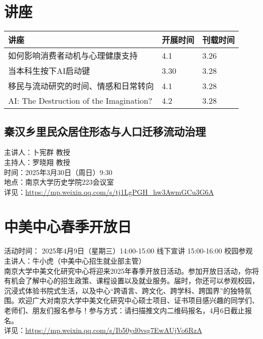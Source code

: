 \documentclass[letterpaper, 12pt]{article}
\begin{document}
\begin{multicols}{2}
\pagebreak

\section{讲座}
\begin{tabular}{|>{\centering\arraybackslash}m{}|m{}|m{}|}
    \hline
    讲座 & 开展时间 & 刊载时间\\
    \hline\hline
    如何影响消费者动机与心理健康支持 & 4.1 & 3.26\\\hline
    当本科生按下AI启动键 & 3.30 & 3.28\\\hline
    移民与流动研究的时间、情感和日常转向 & 4.1 & 3.28\\\hline
    AI: The Destruction of the Imagination? & 4.2 & 3.28\\\hline
\end{tabular}
\subsection{ 秦汉乡里民众居住形态与人口迁移流动治理}
主讲人：卜宪群 教授
\\主持人：罗晓翔 教授
\\时间：2025年3月30日（周日）9:30
\\地点：南京大学历史学院223会议室
\\详见：\url{https://mp.weixin.qq.com/s/tj1LgPGH_hw3AwmGCu3G6A}

\section{中美中心春季开放日}
活动时间： 2025年4月9日（星期三）14:00-15:00 线下宣讲  15:00-16:00 校园参观
\\主讲人：牛小虎（中美中心招生就业部主管）
\\南京大学中美文化研究中心将迎来2025年春季开放日活动。参加开放日活动，你将有机会了解中心的招生政策、课程设置以及就业服务。届时，你还可以参观校园，沉浸式体验书院式生活，以及中心“跨语言、跨文化、跨学科、跨国界”的独特氛围。欢迎广大对南京大学中美文化研究中心硕士项目、证书项目感兴趣的同学们、老师们、朋友们报名参与！参与方式：请扫描推文内二维码报名，4月6日截止报名。
\\详见：\url{https://mp.weixin.qq.com/s/Ib50yd0vsg7EwAUjVo6RzA}


\end{multicols}
\end{document}
